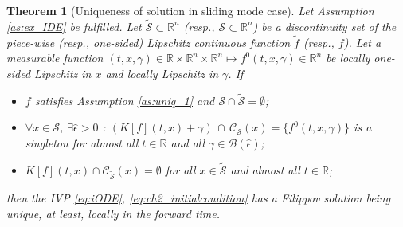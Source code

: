 \documentclass[10pt,a4paper]{amsart}
\newtheorem{theorem}{Theorem}
\newcommand{\R}{\mathbb{R}}
\begin{document}
\begin{theorem}[\small Uniqueness of solution in sliding mode case]\label{thm:unique_SM_iODE}\hfill \newline\itshape
	Let Assumption \ref{as:ex_IDE} be fulfilled. Let    $\tilde {\mathcal{S}}\subset \R^n$ (resp., $\mathcal{S}\subset \R^n$) be a discontinuity set of the piece-wise 	(resp., one-sided) Lipschitz continuous  function $\tilde f$ (resp., $f$). Let a measurable function $(t,x,\gamma)\in \R\times \R^n\times \R^n \mapsto f^0(t,x,\gamma)\in \R^n$ be
 locally one-sided Lipschitz in $x$ and locally Lipschitz in $\gamma$.
	If \vspace{-1mm}
	\begin{itemize} 
	\item[1)]	$f$  satisfies
 Assumption \ref{as:uniq_1} and 
$\mathcal{S}\cap \tilde {\mathcal{S}}=\emptyset$;
\item[2)]  $\forall x\in \mathcal{S}$, $\exists \hat \epsilon\!>\!0$ :  $\left(K[f](t,x)\!+\!\gamma\right)\,\cap\,\mathcal{C}_{\mathcal{S}}(x)\!=\!\{f^0(t,x,\gamma)\}$ is a singleton for almost all $t\in \R$ and 
all $\gamma\in \mathcal{B}(\hat \epsilon)$;
\item[3)]  $K[f](t,x)\cap \mathcal{C}_{\tilde{\mathcal{S}}}(x)\!=\!\emptyset$ for all $x\!\in\! \tilde{\mathcal{S}}$ and almost all $t\!\in\! \R$;\vspace{-1mm}
\end{itemize}
then	the IVP  \eqref{eq:iODE}, \eqref{eq:ch2_initialcondition} has a Filippov solution being unique,  at least, locally in the forward time. 	
\end{theorem}
\end{document}
